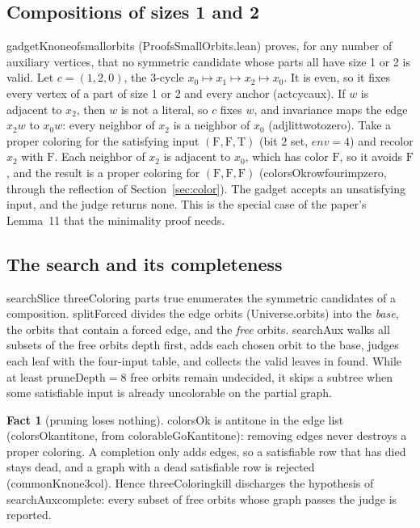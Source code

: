 \documentclass[11pt,a4paper]{article}
\newcommand{\leanus}{\textunderscore\allowbreak}
\newcommand{\lean}[1]{{\ttfamily\let\_\leanus #1}}
\newcommand{\T}{\mathrm{T}}
\newcommand{\F}{\mathrm{F}}
\theoremstyle{definition}
\newtheorem{fact}{Fact}
\begin{document}
\subsection{Compositions of sizes 1 and 2}\label{sec:small}
\lean{gadgetK\_none\_of\_small\_orbits} (\lean{ProofsSmallOrbits.lean})
proves, for any number of auxiliary vertices, that no symmetric candidate
whose parts all have size 1 or 2 is valid. Let $c=(1,2,0)$, the 3-cycle
$x_0\mapsto x_1\mapsto x_2\mapsto x_0$. It is even, so it fixes every vertex
of a part of size 1 or 2 and every anchor (\lean{act\_cyc\_aux}). If $w$ is
adjacent to $x_2$, then $w$ is not a literal, so $c$ fixes $w$, and invariance
maps the edge $x_2w$ to $x_0w$: every neighbor of $x_2$ is a neighbor of $x_0$
(\lean{adj\_lit\_two\_to\_zero}). Take a proper coloring for the satisfying
input $(\F,\F,\T)$ (bit $2$ set, $\mathit{env}=4$) and recolor $x_2$ with
$\F$. Each neighbor of $x_2$ is adjacent to $x_0$, which has color $\F$, so
it avoids $\F$, and the result is a proper coloring for $(\F,\F,\F)$
(\lean{colorsOk\_row\_four\_imp\_zero}, through the reflection of
Section~\ref{sec:color}). The gadget accepts an unsatisfying input, and the
judge returns \lean{none}. This is the special case of the paper's Lemma~11
that the minimality proof needs.

\subsection{The search and its completeness}\label{sec:search}
\lean{searchSlice threeColoring parts true} enumerates the symmetric
candidates of a composition. \lean{splitForced} divides the edge orbits
(\lean{Universe.orbits}) into the \emph{base}, the orbits that contain a
forced edge, and the \emph{free} orbits. \lean{searchAux} walks all subsets
of the free orbits depth first, adds each chosen orbit to the base, judges
each leaf with the four-input table, and collects the valid leaves in
\lean{found}. While at least \lean{pruneDepth}${}=8$ free orbits remain
undecided, it skips a subtree when some satisfiable input is already
uncolorable on the partial graph.

\begin{fact}[pruning loses nothing]
\lean{colorsOk} is antitone in the edge list (\lean{colorsOk\_antitone},
from \lean{colorableGoK\_antitone}): removing edges never destroys a proper
coloring. A completion only adds edges, so a satisfiable row that has died
stays dead, and a graph with a dead satisfiable row is rejected
(\lean{commonK\_none\_3col}). Hence \lean{threeColoring\_kill} discharges the
hypothesis of \lean{searchAux\_complete}: every subset of free orbits whose
graph passes the judge is reported.
\end{fact}
\end{document}
